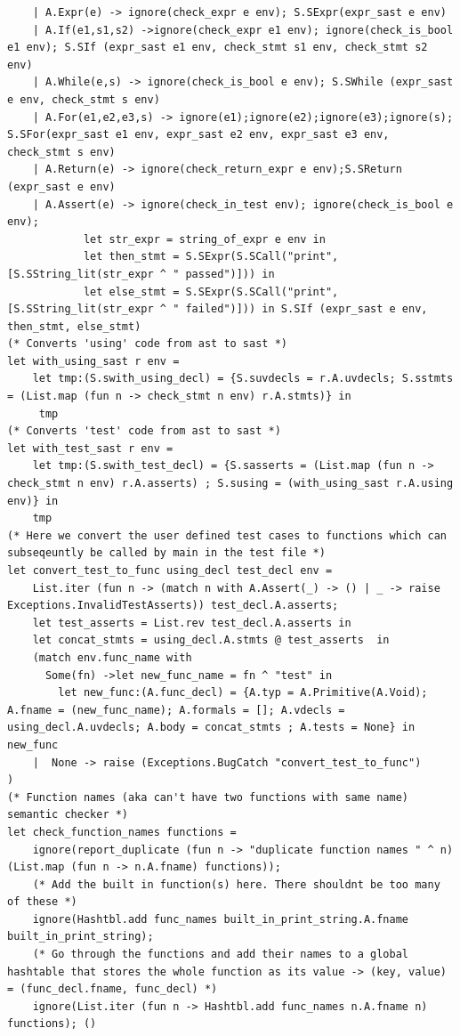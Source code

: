 \documentclass{article}
\begin{document}
\begin{lstlisting}
	| A.Expr(e) -> ignore(check_expr e env); S.SExpr(expr_sast e env)
	| A.If(e1,s1,s2) ->ignore(check_expr e1 env); ignore(check_is_bool e1 env); S.SIf (expr_sast e1 env, check_stmt s1 env, check_stmt s2 env)
	| A.While(e,s) -> ignore(check_is_bool e env); S.SWhile (expr_sast e env, check_stmt s env)
	| A.For(e1,e2,e3,s) -> ignore(e1);ignore(e2);ignore(e3);ignore(s); S.SFor(expr_sast e1 env, expr_sast e2 env, expr_sast e3 env, check_stmt s env) 
	| A.Return(e) -> ignore(check_return_expr e env);S.SReturn (expr_sast e env)
	| A.Assert(e) -> ignore(check_in_test env); ignore(check_is_bool e env); 
			let str_expr = string_of_expr e env in  
			let then_stmt = S.SExpr(S.SCall("print", [S.SString_lit(str_expr ^ " passed")])) in 
			let else_stmt = S.SExpr(S.SCall("print", [S.SString_lit(str_expr ^ " failed")])) in S.SIf (expr_sast e env, then_stmt, else_stmt)
(* Converts 'using' code from ast to sast *)
let with_using_sast r env = 
	let tmp:(S.swith_using_decl) = {S.suvdecls = r.A.uvdecls; S.sstmts = (List.map (fun n -> check_stmt n env) r.A.stmts)} in
	 tmp
(* Converts 'test' code from ast to sast *)
let with_test_sast r env =
	let tmp:(S.swith_test_decl) = {S.sasserts = (List.map (fun n -> check_stmt n env) r.A.asserts) ; S.susing = (with_using_sast r.A.using env)} in
	tmp 
(* Here we convert the user defined test cases to functions which can subseqeuntly be called by main in the test file *)
let convert_test_to_func using_decl test_decl env = 
	List.iter (fun n -> (match n with A.Assert(_) -> () | _ -> raise Exceptions.InvalidTestAsserts)) test_decl.A.asserts;
	let test_asserts = List.rev test_decl.A.asserts in
	let concat_stmts = using_decl.A.stmts @ test_asserts  in
	(match env.func_name with
	  Some(fn) ->let new_func_name = fn ^ "test" in  
		let new_func:(A.func_decl) = {A.typ = A.Primitive(A.Void); A.fname = (new_func_name); A.formals = []; A.vdecls =  using_decl.A.uvdecls; A.body = concat_stmts ; A.tests = None} in new_func
	|  None -> raise (Exceptions.BugCatch "convert_test_to_func")
)
(* Function names (aka can't have two functions with same name) semantic checker *)
let check_function_names functions = 
	ignore(report_duplicate (fun n -> "duplicate function names " ^ n) (List.map (fun n -> n.A.fname) functions));	
	(* Add the built in function(s) here. There shouldnt be too many of these *)
	ignore(Hashtbl.add func_names built_in_print_string.A.fname built_in_print_string);
	(* Go through the functions and add their names to a global hashtable that stores the whole function as its value -> (key, value) = (func_decl.fname, func_decl) *)
	ignore(List.iter (fun n -> Hashtbl.add func_names n.A.fname n) functions); ()

\end{lstlisting}
\end{document}
